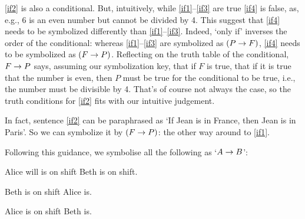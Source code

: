 \ref{if2} is also a conditional. But, intuitively, while \ref{if1}--\ref{if3} are true \ref{if4} is false, as, e.g., 6 is an even number but cannot be divided by 4. This suggest that \ref{if4} needs to be symbolized differently than \ref{if1}--\ref{if3}. Indeed, `only if' inverses the order of the conditional: whereas \ref{if1}--\ref{if3} are symbolized as $(P\rightarrow F)$, \ref{if4} needs to be symbolized as $(F\rightarrow P)$. Reflecting on the truth table of the conditional, $F\rightarrow P$ says, assuming our symbolization key, that if $F$ is true, that if it is true that the number is even, then $P$ must be true for the conditional to be true, i.e., the number must be divisible by 4. That's of course not always the case, so the truth conditions for \ref{if2} fits with our intuitive judgement.


In fact, sentence \ref{if2} can be paraphrased as `If Jean is in France, then Jean is in Paris'. So we can symbolize it by $(F \rightarrow P)$: the other way around to \ref{if1}.
	
	
	Following this guidance, we symbolise all the following as `$A\rightarrow B$':
	\begin{earg}
		\item[\ex{ifthen1}]  Alice will is on shift  Beth is on shift.
		\item[\ex{ifthen2}]  Beth is on shift  Alice is.
		\item[\ex{ifthen3}]  Alice is on shift  Beth is.
	\end{earg}

